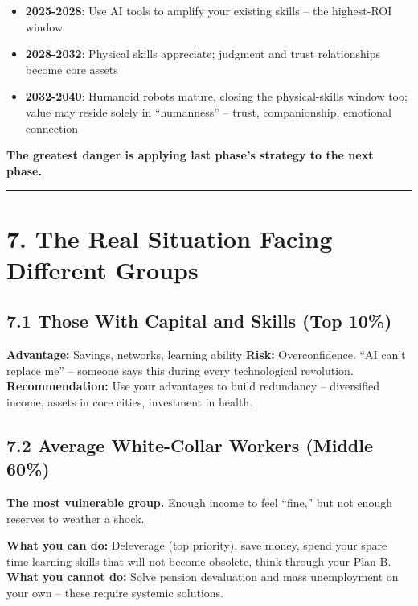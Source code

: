 \begin{itemize}
\tightlist
\item
  \textbf{2025-2028}: Use AI tools to amplify your existing skills --
  the highest-ROI window
\item
  \textbf{2028-2032}: Physical skills appreciate; judgment and trust
  relationships become core assets
\item
  \textbf{2032-2040}: Humanoid robots mature, closing the
  physical-skills window too; value may reside solely in ``humanness''
  -- trust, companionship, emotional connection
\end{itemize}

\textbf{The greatest danger is applying last phase's strategy to the
next phase.}

\begin{center}\rule{0.5\linewidth}{0.5pt}\end{center}

\section{7. The Real Situation Facing Different
Groups}\label{the-real-situation-facing-different-groups}

\subsection{7.1 Those With Capital and Skills (Top
10\%)}\label{those-with-capital-and-skills-top-10}

\textbf{Advantage:} Savings, networks, learning ability \textbf{Risk:}
Overconfidence. ``AI can't replace me'' -- someone says this during
every technological revolution. \textbf{Recommendation:} Use your
advantages to build redundancy -- diversified income, assets in core
cities, investment in health.

\subsection{7.2 Average White-Collar Workers (Middle
60\%)}\label{average-white-collar-workers-middle-60}

\textbf{The most vulnerable group.} Enough income to feel ``fine,'' but
not enough reserves to weather a shock.

\textbf{What you can do:} Deleverage (top priority), save money, spend
your spare time learning skills that will not become obsolete, think
through your Plan B. \textbf{What you cannot do:} Solve pension
devaluation and mass unemployment on your own -- these require systemic
solutions.

